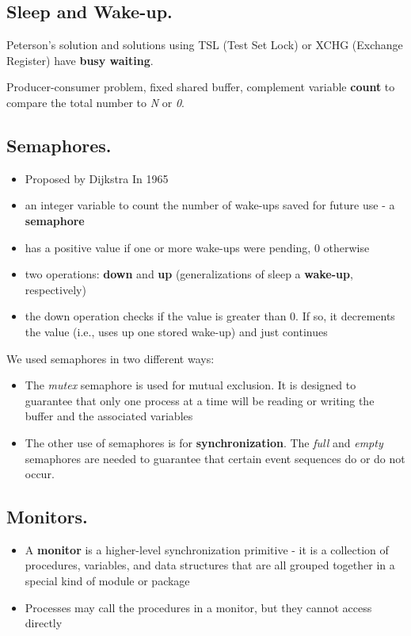 \documentclass{article}
\newcounter{exercise}
\newcounter{problem}[exercise]
\begin{document}
\subsection*{Sleep and Wake-up.}
\noindent

Peterson's solution and solutions using TSL (Test Set Lock) or XCHG (Exchange Register) have \textbf{busy waiting}.

Producer-consumer problem, fixed shared buffer, complement variable \textbf{count} to compare the total number to \textit{N} or \textit{0}.

\subsection*{Semaphores.}
\noindent

\begin{itemize}
  \item Proposed by Dijkstra In 1965 
  \item an integer variable to count the number of wake-ups saved for future use - a \textbf{semaphore}
  \item has a positive value if one or more wake-ups were pending, 0 otherwise
  \item two operations: \textbf{down} and \textbf{up} (generalizations of sleep a \textbf{wake-up}, respectively)
  \item the down operation checks if the value is greater than 0. If so, it decrements the value (i.e., uses up one
    stored wake-up) and just continues
\end{itemize}

We used semaphores in two different ways:

\begin{itemize}
  \item The \textit{mutex} semaphore is used for mutual exclusion. It is designed to guarantee that only one process at a time will be reading or writing the buffer and the associated variables
  \item The other use of semaphores is for \textbf{synchronization}. The \textit{full} and \textit{empty} semaphores are needed to guarantee that certain event sequences do or do not occur.
\end{itemize}

\subsection*{Monitors.}

\begin{itemize}
  \item A \textbf{monitor} is a higher-level synchronization primitive - it is a collection of procedures, variables, and data structures that are all grouped together in a special kind of module or package
  \item Processes may call the procedures in a monitor, but they cannot access directly
\end{itemize}
\end{document}
